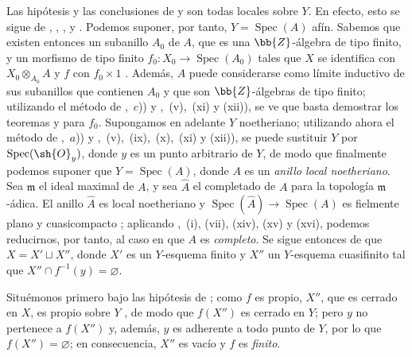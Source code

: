 \begin{env}[8.11.4]
\label{IV.8.11.4}
Las hipótesis y las conclusiones de  y  son todas locales sobre $Y$.
En efecto, esto se sigue de , , ,  y .
Podemos suponer, por tanto, $Y=\operatorname{Spec}(A)$ afín.
Sabemos que existen entonces un subanillo $A_0$ de $A$, que es una $\bb{Z}$-álgebra de tipo finito, y un morfismo de tipo finito $f_0:X_0\to\operatorname{Spec}(A_0)$ tales que $X$ se identifica con $X_0\otimes_{A_0}A$ y $f$ con $f_0\times 1$ .
Además, $A$ puede considerarse como límite inductivo de sus subanillos que contienen $A_0$ y que son $\bb{Z}$-álgebras de tipo finito; utilizando el método de ,~$c$)) y ,~(v),~(xi) y (xii)), se ve que basta demostrar los teoremas  y  para $f_0$.
Supongamos en adelante $Y$ noetheriano; utilizando ahora el método de ,~$a$)) y ,~(v),~(ix),~(x),~(xi) y (xii)), se puede sustituir $Y$ por $\operatorname{Spec}(\sh{O}_y)$, donde $y$ es un
punto arbitrario de $Y$, de modo que finalmente podemos suponer que $Y=\operatorname{Spec}(A)$, donde $A$ es un \emph{anillo local noetheriano}.
Sea $\mathfrak{m}$ el ideal maximal de $A$, y sea $\hat{A}$ el completado de $A$ para la topología $\mathfrak{m}$-ádica. El anillo $\hat{A}$ es local noetheriano y $\operatorname{Spec}(\hat{A})\to\operatorname{Spec}(A)$ es fielmente plano y cuasicompacto ; aplicando ,~(i), (vii), (xiv), (xv) y (xvi), podemos reducirnos, por tanto, al caso en que $A$ es \emph{completo}.
Se sigue entonces de  que $X=X'\sqcup X''$, donde $X'$ es un $Y$-esquema finito y $X''$ un $Y$-esquema cuasifinito tal que $X''\cap f^{-1}(y)=\varnothing$.
\end{env}

Situémonos primero bajo las hipótesis de ; como $f$ es propio, $X''$, que es cerrado en $X$, es propio sobre $Y$ , de modo que $f(X'')$ es cerrado en $Y$; pero $y$ no pertenece a $f(X'')$ y, además, $y$ es adherente a todo punto de $Y$, por lo que $f(X'')=\varnothing$; en consecuencia, $X''$ es vacío y $f$ es \emph{finito}.

